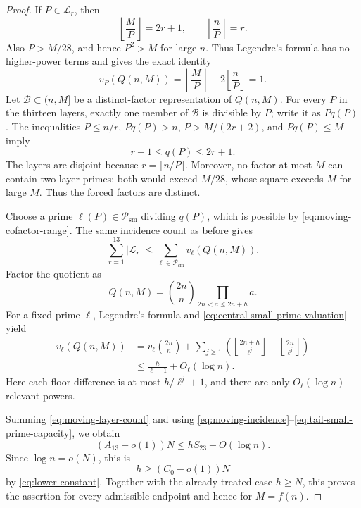 \documentclass[11pt]{article}
\numberwithin{equation}{section}
\theoremstyle{definition}
\theoremstyle{remark}
\newcommand{\1}{\mathbf 1}
\begin{document}
\begin{proof}
If \(P\in\mathcal L_r\), then
\[
 \left\lfloor\frac MP\right\rfloor=2r+1,
 \qquad
 \left\lfloor\frac nP\right\rfloor=r.
\]
Also \(P>M/28\), and hence \(P^2>M\) for large \(n\).  Thus Legendre's
formula has no higher-power terms and gives the exact identity
\begin{equation}
          v_P(Q(n,M))
          =\left\lfloor\frac MP\right\rfloor
            -2\left\lfloor\frac nP\right\rfloor
          =1.
 \label{eq:moving-carry-one}
\end{equation}
Let \(\mathcal B\subset(n,M]\) be a distinct-factor representation of
\(Q(n,M)\).  For every \(P\) in the thirteen layers, exactly one member
of \(\mathcal B\) is divisible by \(P\); write it as \(Pq(P)\).
The inequalities \(P\le n/r\), \(Pq(P)>n\),
\(P>M/(2r+2)\), and \(Pq(P)\le M\) imply
\begin{equation}
              r+1\le q(P)\le2r+1.
              \label{eq:moving-cofactor-range}
\end{equation}
The layers are disjoint because \(r=\lfloor n/P\rfloor\).  Moreover, no
factor at most \(M\) can contain two layer primes: both would exceed
\(M/28\), whose square exceeds \(M\) for large \(M\).  Thus the forced
factors are distinct.

Choose a prime
\(\ell(P)\in\mathcal P_{\mathrm{sm}}\) dividing \(q(P)\), which is
possible by \eqref{eq:moving-cofactor-range}.  The same incidence count
as before gives
\begin{equation}
 \sum_{r=1}^{13}\lvert\mathcal L_r\rvert
 \le
 \sum_{\ell\in\mathcal P_{\mathrm{sm}}}v_\ell(Q(n,M)).
 \label{eq:moving-incidence}
\end{equation}
Factor the quotient as
\[
 Q(n,M)
   =\binom{2n}{n}\prod_{2n<a\le2n+h}a.
\]
For a fixed prime \(\ell\), Legendre's formula and
\eqref{eq:central-small-prime-valuation} yield
\begin{equation}
 \begin{split}
 v_\ell(Q(n,M))
  &=v_\ell\binom{2n}{n}
    +\sum_{j\ge1}
      \left(
       \left\lfloor\frac{2n+h}{\ell^j}\right\rfloor
       -\left\lfloor\frac{2n}{\ell^j}\right\rfloor
      \right)\\
  &\le \frac{h}{\ell-1}+O_\ell(\log n).
 \end{split}
 \label{eq:tail-small-prime-capacity}
\end{equation}
Here each floor difference is at most \(h/\ell^j+1\), and there are
only \(O_\ell(\log n)\) relevant powers.

Summing \eqref{eq:moving-layer-count} and using
\eqref{eq:moving-incidence}--\eqref{eq:tail-small-prime-capacity}, we
obtain
\[
       (A_{13}+o(1))N
       \le hS_{23}+O(\log n).
\]
Since \(\log n=o(N)\), this is
\[
              h\ge(C_0-o(1))N
\]
by \eqref{eq:lower-constant}.  Together with the already treated case
\(h\ge N\), this proves the assertion for every admissible endpoint and
hence for \(M=f(n)\).
\end{proof}
\end{document}
